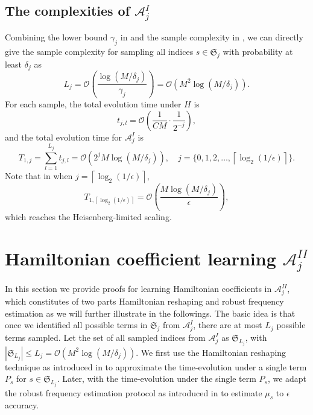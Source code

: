 \documentclass[twocolumn,superscriptaddress,aps,showpacs,amsmath,amstex,amssymb,citeautoscript,floatfix,pra,preprintnumbers]{revtex4-2}
\theoremstyle{plain}
\theoremstyle{plain}
\theoremstyle{plain}
\theoremstyle{plain}
\theoremstyle{plain}
\theoremstyle{plain}
\begin{document}
\begin{appendix}
\subsection{The complexities of \texorpdfstring{$\mathcal{A}^{I}_j$}{A I j}\label{sec:complexity_I}}
\label{sec:complexities_of_A_1}
Combining the lower bound $\gamma_j$ in  and the sample complexity in , we can directly give the sample complexity for sampling all indices $s\in\mathfrak{S}_j$ with probability at least $\delta_j$ as
\begin{equation}
    L_j = \mathcal{O}\left(\frac{\log(M/\delta_j)}{\gamma_j}\right)=\mathcal{O}\left(M^2\log(M/\delta_j)\right).
\end{equation}
For each sample, the total evolution time under $H$ is 
\begin{equation}
    t_{j,l} = \mathcal{O}\left(\frac{1}{CM}\cdot\frac{1}{2^{-j}}\right),
\end{equation}
and the total evolution time for $\mathcal{A}^{I}_j$ is
\begin{equation}
    T_{1,j} = \sum_{l=1}^{L_j} t_{j,l} = \mathcal{O}(2^j M\log(M/\delta_{j})),\quad j = \{0,1,2,\ldots, \left\lceil\log_2(1/\epsilon)\right\rceil\}.
\end{equation}
Note that in when $j=\left\lceil\log_2(1/\epsilon)\right\rceil$, 
\[
T_{1,\left\lceil\log_2(1/\epsilon)\right\rceil} = \mathcal{O}\left(\frac{M\log(M/\delta_{j})}{\epsilon}\right),
\]
which reaches the Heisenberg-limited scaling.


\section{Hamiltonian coefficient learning \texorpdfstring{$\mathcal{A}^{II}_j$}{A II j}}
\label{app:coef_learning}
In this section we provide proofs for learning Hamiltonian coefficients in $\mathcal{A}^{II}_j$, which constitutes of two parts Hamiltonian reshaping and robust frequency estimation as we will further illustrate in the followings. The basic idea is that once we identified all possible terms in $\mathfrak{S}_j$ from $\mathcal{A}^{I}_j$, there are at most $L_j$ possible terms sampled. Let the set of all sampled indices from $\mathcal{A}^{I}_j$ as $\mathfrak{S}_{L_j}$, with $|\mathfrak{S}_{L_j}|\leq L_j = \mathcal{O}\left(M^2\log(M/\delta_j)\right)$. We first use the Hamiltonian reshaping technique as introduced in  to approximate the time-evolution under a single term $P_s$ for $s\in \mathfrak{S}_{L_j}$. Later, with the time-evolution under the single term $P_s$, we adapt the robust frequency estimation protocol as introduced in  to estimate $\mu_s$ to $\epsilon$ accuracy. 



\end{appendix}
\end{document}
